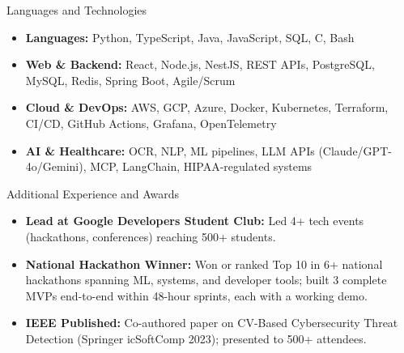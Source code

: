 \documentclass[]{mcdowellcv}
\begin{document}
\begin{cvsection}{Languages and Technologies}
  \begin{cvsubsection}{}{}{}
    \begin{itemize}
      \item \textbf{Languages:} Python, TypeScript, Java, JavaScript, SQL, C, Bash
      \item \textbf{Web \& Backend:} React, Node.js, NestJS, REST APIs, PostgreSQL, MySQL, Redis, Spring Boot, Agile/Scrum
      \item \textbf{Cloud \& DevOps:} AWS, GCP, Azure, Docker, Kubernetes, Terraform, CI/CD, GitHub Actions, Grafana, OpenTelemetry
      \item \textbf{AI \& Healthcare:} OCR, NLP, ML pipelines, LLM APIs (Claude/GPT-4o/Gemini), MCP, LangChain, HIPAA-regulated systems
    \end{itemize}
  \end{cvsubsection}
\end{cvsection}

\begin{cvsection}{Additional Experience and Awards}
  \begin{cvsubsection}{}{}{}
    \begin{itemize}
      \item \textbf{Lead at Google Developers Student Club:} Led 4+ tech events (hackathons, conferences) reaching 500+ students.
      \item \textbf{National Hackathon Winner:} Won or ranked Top 10 in 6+ national hackathons spanning ML, systems, and developer tools; built 3 complete MVPs end-to-end within 48-hour sprints, each with a working demo.
      \item \textbf{IEEE Published:} Co-authored paper on CV-Based Cybersecurity Threat Detection (Springer icSoftComp 2023); presented to 500+ attendees.
    \end{itemize}
  \end{cvsubsection}
\end{cvsection}
\end{document}
